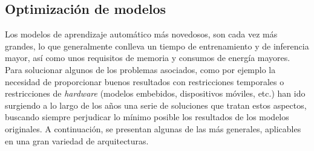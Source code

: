 \subsection{Optimización de modelos}


Los modelos de aprendizaje automático más novedosos, son cada vez más grandes, lo que generalmente conlleva un tiempo de entrenamiento y de inferencia mayor, así como unos requisitos de memoria y consumos de energía mayores. Para solucionar algunos de los problemas asociados, como por ejemplo la necesidad de proporcionar buenos resultados con restricciones temporales o restricciones de \textit{hardware} (modelos embebidos, dispositivos móviles, etc.) han ido surgiendo a lo largo de los años una serie de soluciones que tratan estos aspectos, buscando siempre perjudicar lo mínimo posible los resultados de los modelos originales. A continuación, se presentan algunas de las más generales, aplicables en una gran variedad de arquitecturas.

